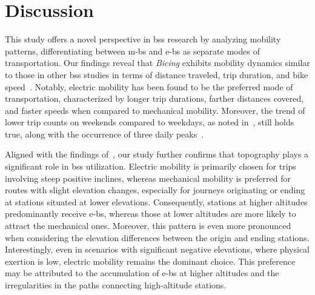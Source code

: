 \section{Discussion}

This study offers a novel perspective in \ac{bss} research by analyzing mobility patterns, differentiating between \acp{m-b} and \acp{e-b} as separate modes of transportation. Our findings reveal that \textit{Bicing} exhibits mobility dynamics similar to those in other \ac{bss} studies in terms of distance traveled, trip duration, and bike speed~\cite{Jensen2010, Ciancia2015, Zaltz2013, Chiariotti2018, Borgnat2011, Zhang2016Bicycle}. Notably, electric mobility has been found to be the preferred mode of transportation, characterized by longer trip durations, farther distances covered, and faster speeds when compared to mechanical mobility. Moreover, the trend of lower trip counts on weekends compared to weekdays, as noted in~\cite{Froehlich2009, Bustamante2022}, still holds true, along with the occurrence of three daily peaks~\cite{Froehlich2009}. 

Aligned with the findings of~\cite{Morency2015, Kim2020}, our study further confirms that topography plays a significant role in \ac{bss} utilization. Electric mobility is primarily chosen for trips involving steep positive inclines, whereas mechanical mobility is preferred for routes with slight elevation changes, especially for journeys originating or ending at stations situated at lower elevations. Consequently, stations at higher altitudes predominantly receive \acp{e-b}, whereas those at lower altitudes are more likely to attract the mechanical ones. Moreover, this pattern is even more pronounced when considering the elevation differences between the origin and ending stations. Interestingly, even in scenarios with significant negative elevations, where physical exertion is low, electric mobility remains the dominant choice. This preference may be attributed to the accumulation of \acp{e-b} at higher altitudes and the irregularities in the paths connecting high-altitude stations.

